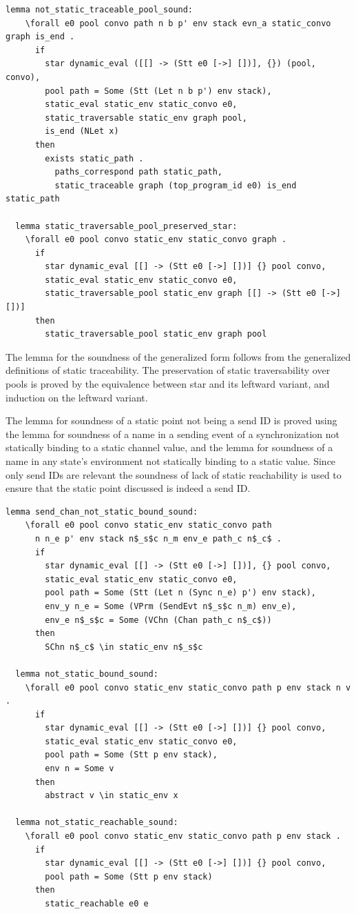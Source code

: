 \documentclass{article}
\begin{document}
\begin{lstlisting}[language=logic, mathescape]
  lemma not_static_traceable_pool_sound:
    \forall e0 pool convo path n b p' env stack evn_a static_convo graph is_end .
      if
        star dynamic_eval ([[] -> (Stt e0 [->] [])], {}) (pool, convo), 
        pool path = Some (Stt (Let n b p') env stack), 
        static_eval static_env static_convo e0, 
        static_traversable static_env graph pool, 
        is_end (NLet x)
      then
        exists static_path . 
          paths_correspond path static_path, 
          static_traceable graph (top_program_id e0) is_end static_path

  lemma static_traversable_pool_preserved_star:
    \forall e0 pool convo static_env static_convo graph .
      if
        star dynamic_eval [[] -> (Stt e0 [->] [])] {} pool convo, 
        static_eval static_env static_convo e0,
        static_traversable_pool static_env graph [[] -> (Stt e0 [->] [])]
      then
        static_traversable_pool static_env graph pool 
\end{lstlisting}


The lemma for the soundness of the generalized form follows from the generalized definitions
of static traceability. The preservation of static traversability over pools is proved by the
equivalence between star and its leftward variant, and induction on the leftward variant.

The lemma for soundness of a static point not being a send ID is proved using the lemma for
soundness of a name in a sending event of a synchronization not statically binding to a static
channel value, and the lemma for soundness of a name in any state's environment
not statically binding to a static value.  Since only send IDs are relevant
the soundness of lack of static reachability is
used to ensure that the static point discussed is indeed a send ID. 

\begin{lstlisting}[language=logic, mathescape]
  lemma send_chan_not_static_bound_sound:
    \forall e0 pool convo static_env static_convo path
      n n_e p' env stack n$_s$c n_m env_e path_c n$_c$ .
      if
        star dynamic_eval [[] -> (Stt e0 [->] [])], {} pool convo,
        static_eval static_env static_convo e0,
        pool path = Some (Stt (Let n (Sync n_e) p') env stack),
        env_y n_e = Some (VPrm (SendEvt n$_s$c n_m) env_e),
        env_e n$_s$c = Some (VChn (Chan path_c n$_c$))
      then
        SChn n$_c$ \in static_env n$_s$c

  lemma not_static_bound_sound:
    \forall e0 pool convo static_env static_convo path p env stack n v .
      if
        star dynamic_eval [[] -> (Stt e0 [->] [])] {} pool convo,
        static_eval static_env static_convo e0, 
        pool path = Some (Stt p env stack), 
        env n = Some v
      then
        abstract v \in static_env x

  lemma not_static_reachable_sound:
    \forall e0 pool convo static_env static_convo path p env stack .
      if
        star dynamic_eval [[] -> (Stt e0 [->] [])] {} pool convo,
        pool path = Some (Stt p env stack)
      then
        static_reachable e0 e
\end{lstlisting}
\end{document}
